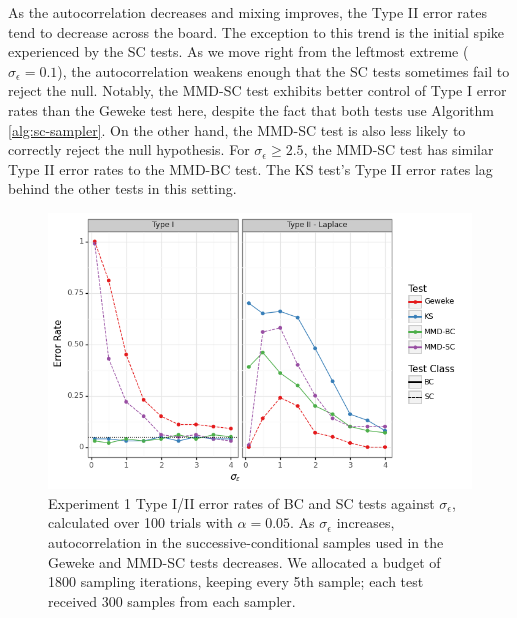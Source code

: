 \documentclass[a4paper,11pt]{article}
\begin{document}
As the autocorrelation decreases and mixing improves, the Type II error rates tend to decrease across the board. The exception to this trend is the initial spike experienced by the SC tests. As we move right from the leftmost extreme ($\sigma_{\epsilon} = 0.1$), the autocorrelation weakens enough that the SC tests sometimes fail to reject the null. Notably, the MMD-SC test exhibits better control of Type I error rates than the Geweke test here, despite the fact that both tests use Algorithm \ref{alg:sc-sampler}. On the other hand, the MMD-SC test is also less likely to correctly reject the null hypothesis. For $\sigma_{\epsilon} \geq 2.5$, the MMD-SC test has similar Type II error rates to the MMD-BC test. The KS test's Type II error rates lag behind the other tests in this setting.

\begin{figure}[H]
    \centering
    \includegraphics[width=\textwidth]{figures/gandy_scott_auto.png}
    \caption{Experiment 1 Type I/II error rates of BC and SC tests against $\sigma_{\epsilon}$, calculated over 100 trials with $\alpha=0.05$. As $\sigma_{\epsilon}$ increases, autocorrelation in the successive-conditional samples used in the Geweke and MMD-SC tests decreases. We allocated a budget of 1800 sampling iterations, keeping every 5th sample; each test received 300 samples from each sampler.}
    \label{fig:ex1_auto}
\end{figure}
\end{document}
